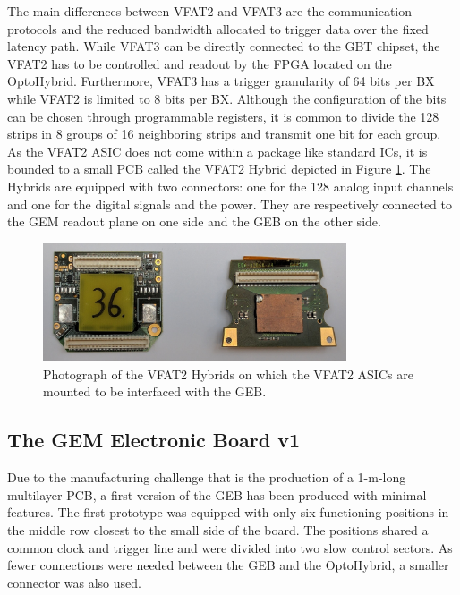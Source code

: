       The main differences between VFAT2 and VFAT3 are the communication protocols and the reduced bandwidth allocated to trigger data over the fixed latency path. While VFAT3 can be directly connected to the GBT chipset, the VFAT2 has to be controlled and readout by the FPGA located on the OptoHybrid. Furthermore, VFAT3 has a trigger granularity of 64 bits per BX while VFAT2 is limited to 8 bits per BX. Although the configuration of the bits can be chosen through programmable registers, it is common to divide the 128 strips in 8 groups of 16 neighboring strips and transmit one bit for each group. \\

      As the VFAT2 ASIC does not come within a package like standard ICs, it is bounded to a small PCB called the VFAT2 Hybrid depicted in Figure \ref{fig:II-2-vfat2-hybrid}. The Hybrids are equipped with two connectors: one for the 128 analog input channels and one for the digital signals and the power. They are respectively connected to the GEM readout plane on one side and the GEB on the other side.

      \begin{figure}[h!]
        \centering
        \includegraphics[width=0.8\textwidth]{img/II-2-daq/vfat2-hybrid.jpg}
        \caption{Photograph of the VFAT2 Hybrids on which the VFAT2 ASICs are mounted to be interfaced with the GEB.}
        \label{fig:II-2-vfat2-hybrid}
      \end{figure}

    \subsection{The GEM Electronic Board v1}

      Due to the manufacturing challenge that is the production of a 1-m-long multilayer PCB, a first version of the GEB has been produced with minimal features. The first prototype was equipped with only six functioning positions in the middle row closest to the small side of the board. The positions shared a common clock and trigger line and were divided into two slow control sectors. As fewer connections were needed between the GEB and the OptoHybrid, a smaller connector was also used.

